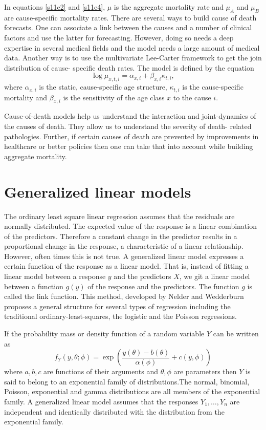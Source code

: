 \documentclass{article}
\numberwithin{equation}{section}
\begin{document}
In equations \eqref{s11e2} and \eqref{s11e4}, $\mu$ is the aggregate mortality
rate and $\mu_A$ and $\mu_B$ are cause-specific mortality rates. There are 
several ways to build cause of death forecasts. One can associate a link
between the causes and a number of clinical factors and use the latter for
forecasting. However, doing so needs a deep expertise in several medical fields
and the model needs a large amount of medical data. Another way is to use
the multivariate Lee-Carter framework to get the join distribution of cause-
specific death rates. The model is defined by the equation
\begin{equation}\label{s11e5}
\log\mu_{x,t,i} = \alpha_{x,i} + \beta_{x,i}\kappa_{t,i},
\end{equation}
where $\alpha_{x,i}$ is the static, cause-specific age structure, $\kappa_{t,i}$
is the cause-specific mortality and $\beta_{x,i}$ is the sensitivity of the
age class $x$ to the cause $i$. 

Cause-of-death models help us understand the interaction and joint-dynamics
of the causes of death. They allow us to understand the severity of death-
related pathologies. Further, if certain causes of death are prevented by
improvements in healthcare or better policies then one can take that into 
account while building aggregate mortality.

\section{Generalized linear models}\label{s12}
The ordinary least square linear regression assumes that the residuals are
normally distributed. The expected value of the response is a linear
combination of the predictors. Therefore a constant change in the predictor
results in a proportional change in the response, a characteristic of a linear
relationship. However, often times this is not true. A generalized linear 
model expresses a certain function of the response as a linear model. That is,
instead of fitting a linear model between a response $y$ and the predictors $X$,
we git a linear model between a function $g(y)$ of the response and the
predictors. The function $g$ is called the link function. This method,
developed by Nelder and Wedderburn \cite{nelder1972generalized} proposes a 
general structure for several types of regression including the traditional
ordinary-least-squares, the logistic and the Poisson regressions. 

If the probability mass or density function of a random variable $Y$ can be
written as
\begin{equation}\label{s12e1}
f_Y(y, \theta; \phi) = 
\exp\left(\frac{y(\theta) - b(\theta)}{\alpha(\phi)} + c(y, \phi)\right)
\end{equation}
where $a, b, c$ are functions of their arguments and $\theta, \phi$ are
parameters then $Y$ is said to belong to an exponential family of distributions.The normal, binomial, Poisson, exponential and gamma distributions are all
members of the exponential family. A generalized linear model assumes that
the responses $Y_1, \ldots, Y_n$ are independent and identically distributed
with the distribution from the exponential family. 
\end{document}
